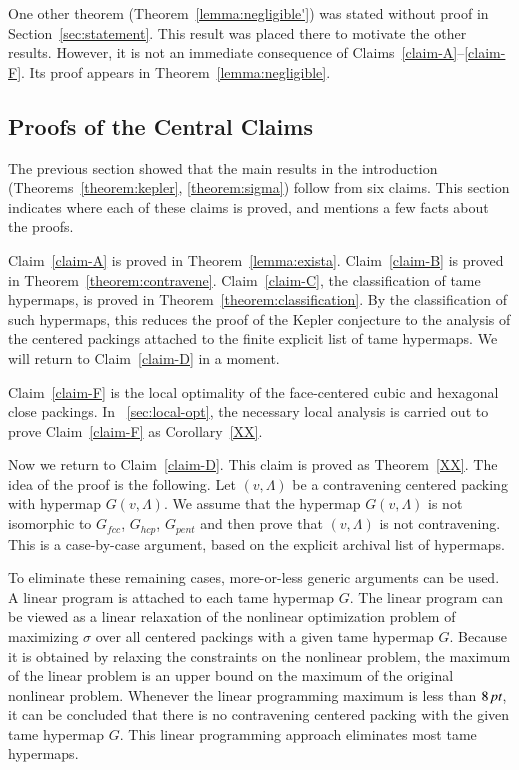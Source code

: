 \begin{remark}
One other theorem (Theorem~\ref{lemma:negligible'}) was stated
without proof in Section~\ref{sec:statement}.  This result was
placed there to motivate the other results.  However, it is not an
immediate consequence of Claims~\ref{claim-A}--\ref{claim-F}.  Its
proof appears in Theorem~\ref{lemma:negligible}.
\end{remark}

\subsection{Proofs of the Central Claims}

The previous section showed that the main results in the
introduction (Theorems~\ref{theorem:kepler}, \ref{theorem:sigma})
follow from six claims. This section indicates where each of these
claims is proved, and mentions a few facts about the proofs.

Claim~\ref{claim-A} is proved in Theorem~\ref{lemma:exista}.
Claim~\ref{claim-B} is proved in Theorem~\ref{theorem:contravene}.
Claim~\ref{claim-C}, the classification of tame hypermaps, is
proved in Theorem~\ref{theorem:classification}. By the
classification of such hypermaps, this reduces the proof of the
Kepler conjecture to the analysis of the centered packings
attached to the finite explicit list of tame hypermaps.  We will
return to Claim~\ref{claim-D} in a moment.

Claim~\ref{claim-F} is the local optimality of the face-centered
cubic and hexagonal close packings.   In
\Chap~\ref{sec:local-opt}, the necessary local analysis is carried
out to prove Claim~\ref{claim-F} as
Corollary~\ref{XX}.

Now we return to Claim~\ref{claim-D}. This claim is proved as
Theorem~\ref{XX}.  The idea of the proof is the
following.  Let $(v,\Lambda)$ be a contravening centered packing with
hypermap $G(v,\Lambda)$. We assume that the hypermap $G(v,\Lambda)$ is not
isomorphic to $G_{fcc}$, $G_{hcp}$, $G_{pent}$ and then prove that
$(v,\Lambda)$ is not contravening. This is a case-by-case argument, based on
the explicit archival list of hypermaps.

To eliminate these remaining cases, more-or-less generic arguments
can be used.  A linear program is attached to each tame hypermap
$G$. The linear program can be viewed as a linear relaxation of
the nonlinear optimization problem of maximizing $\sigma$ over all
centered packings with a given tame hypermap $G$. Because it is
obtained by relaxing the constraints on the nonlinear problem, the
maximum of the linear problem is an upper bound on the maximum of
the original nonlinear problem. Whenever the linear programming
maximum is less than $8\,\hbox{\it pt}$, it can be concluded that there is
no contravening centered packing with the given tame hypermap $G$.
This linear programming approach eliminates most tame hypermaps.

